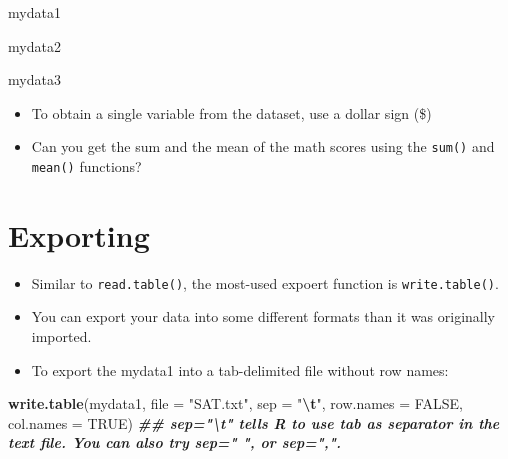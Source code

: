 \documentclass[
]{book}
\newenvironment{Shaded}{\begin{snugshade}}{\end{snugshade}}
\newcommand{\AttributeTok}[1]{\textcolor[rgb]{0.13,0.29,0.53}{#1}}
\newcommand{\ConstantTok}[1]{\textcolor[rgb]{0.56,0.35,0.01}{#1}}
\newcommand{\DocumentationTok}[1]{\textcolor[rgb]{0.56,0.35,0.01}{\textbf{\textit{#1}}}}
\newcommand{\FunctionTok}[1]{\textcolor[rgb]{0.13,0.29,0.53}{\textbf{#1}}}
\newcommand{\NormalTok}[1]{#1}
\newcommand{\SpecialCharTok}[1]{\textcolor[rgb]{0.81,0.36,0.00}{\textbf{#1}}}
\newcommand{\StringTok}[1]{\textcolor[rgb]{0.31,0.60,0.02}{#1}}
\providecommand{\tightlist}{%
  \setlength{\itemsep}{0pt}\setlength{\parskip}{0pt}}
\begin{document}
\begin{Shaded}
\begin{Highlighting}[]
\NormalTok{mydata1}

\NormalTok{mydata2}

\NormalTok{mydata3}
\end{Highlighting}
\end{Shaded}

\begin{itemize}
\tightlist
\item
  To obtain a single variable from the dataset, use a dollar sign (\$)
\end{itemize}

\begin{Shaded}
\end{Shaded}

\begin{itemize}
\tightlist
\item
  Can you get the sum and the mean of the math scores using the \texttt{sum()} and \texttt{mean()} functions?
\end{itemize}

\section{Exporting}\label{exporting}

\begin{itemize}
\tightlist
\item
  Similar to \texttt{read.table()}, the most-used expoert function is \texttt{write.table()}.
\item
  You can export your data into some different formats than it was originally imported.
\item
  To export the mydata1 into a tab-delimited file without row names:
\end{itemize}

\begin{Shaded}
\begin{Highlighting}[]
\FunctionTok{write.table}\NormalTok{(mydata1, }\AttributeTok{file =} \StringTok{"SAT.txt"}\NormalTok{, }\AttributeTok{sep =} \StringTok{"}\SpecialCharTok{\textbackslash{}t}\StringTok{"}\NormalTok{, }\AttributeTok{row.names =} \ConstantTok{FALSE}\NormalTok{, }\AttributeTok{col.names =} \ConstantTok{TRUE}\NormalTok{)}
\DocumentationTok{\#\# sep="\textbackslash{}t" tells R to use tab as separator in the text file. You can also try sep=" ", or sep=",".}
\end{Highlighting}
\end{Shaded}
\end{document}

